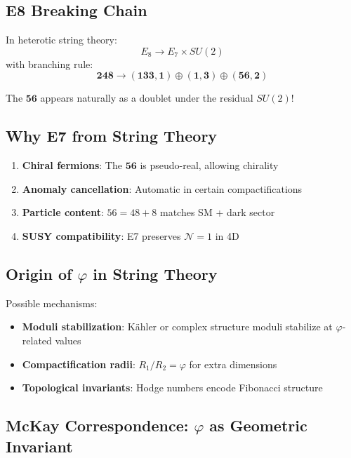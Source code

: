 \documentclass[11pt,a4paper]{article}
\begin{document}
\subsection{E8 Breaking Chain}

In heterotic string theory:
\begin{equation}
E_8 \to E_7 \times SU(2)
\end{equation}
with branching rule:
\begin{equation}
\mathbf{248} \to (\mathbf{133}, \mathbf{1}) \oplus (\mathbf{1}, \mathbf{3}) \oplus (\mathbf{56}, \mathbf{2})
\end{equation}

The $\mathbf{56}$ appears naturally as a doublet under the residual $SU(2)$!

\subsection{Why E7 from String Theory}

\begin{enumerate}
\item \textbf{Chiral fermions}: The $\mathbf{56}$ is pseudo-real, allowing chirality
\item \textbf{Anomaly cancellation}: Automatic in certain compactifications
\item \textbf{Particle content}: $56 = 48 + 8$ matches SM + dark sector
\item \textbf{SUSY compatibility}: E7 preserves $\mathcal{N}=1$ in 4D
\end{enumerate}

\subsection{Origin of $\varphi$ in String Theory}

Possible mechanisms:
\begin{itemize}
\item \textbf{Moduli stabilization}: K\"ahler or complex structure moduli stabilize at $\varphi$-related values
\item \textbf{Compactification radii}: $R_1/R_2 = \varphi$ for extra dimensions
\item \textbf{Topological invariants}: Hodge numbers encode Fibonacci structure
\end{itemize}

\subsection{McKay Correspondence: $\varphi$ as Geometric Invariant}
\label{sec:mckay-correspondence}
\end{document}
